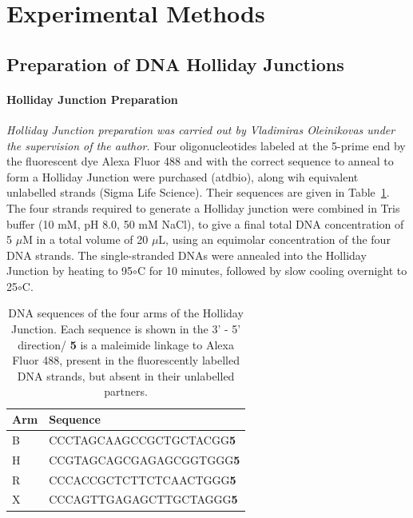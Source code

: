 \section{Experimental Methods}
\subsection{Preparation of DNA Holliday Junctions}
\label{sect:HJ_preparation}
\paragraph{Holliday Junction Preparation}
\emph{Holliday Junction preparation was carried out by \mbox{Vladimiras} Oleinikovas under the supervision of the author.}
Four oligonucleotides labeled at the 5-prime end by the fluorescent dye Alexa Fluor 488 and with the correct sequence to anneal to form a Holliday Junction were purchased (atdbio), along wih equivalent unlabelled strands (Sigma Life Science). Their sequences are given in Table~\ref{tab:table1_DNAsequences}. The four strands required to generate a Holliday junction were combined in Tris buffer (10 mM, pH 8.0, 50 mM NaCl), to give a final total DNA concentration of 5 $\mu$M in a total volume of 20 $\mu$L, using an equimolar concentration of the four DNA strands. The single-stranded DNAs were annealed into the Holliday Junction by heating to 95$\circ$C for 10 minutes, followed by slow cooling overnight to 25$\circ$C.

\begin{center}
\begin{table}[!ht]
\caption{DNA sequences of the four arms of the Holliday Junction. Each sequence is shown in the 3' - 5' direction/ {\bf 5} is a maleimide linkage to Alexa Fluor 488, present in the fluorescently labelled DNA strands, but absent in their unlabelled partners.}
\begin{tabular}{|l|l|}
\hline
{\bf Arm} & {\bf Sequence}\\ \hline
B & CCCTAGCAAGCCGCTGCTACGG{\bf 5} \\
H & CCGTAGCAGCGAGAGCGGTGGG{\bf 5} \\
R & CCCACCGCTCTTCTCAACTGGG{\bf 5} \\
X & CCCAGTTGAGAGCTTGCTAGGG{\bf 5} \\ \hline
\end{tabular}
\label{tab:table1_DNAsequences}
\end{table}
\end{center}


